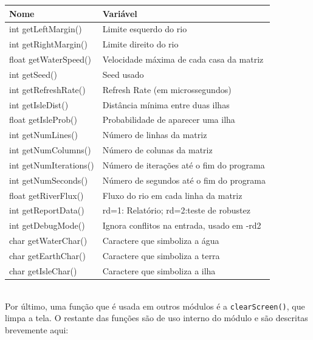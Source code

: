 \documentclass[11pt,a4paper]{article}
\begin{document}
\begin{tabular}{|l|l|}
\hline 
\textbf{Nome} & \textbf{Variável} \\ 
\hline 
int getLeftMargin() & Limite esquerdo do rio \\ 
\hline 
int getRightMargin() & Limite direito do rio \\ 
\hline 
float getWaterSpeed() & Velocidade máxima de cada casa da matriz \\ 
\hline 
int getSeed() & Seed usado \\ 
\hline 
int getRefreshRate() & Refresh Rate (em microssegundos) \\ 
\hline 
int getIsleDist() & Distância mínima entre duas ilhas \\ 
\hline 
float getIsleProb() & Probabilidade de aparecer uma ilha \\ 
\hline 
int getNumLines() & Número de linhas da matriz \\ 
\hline 
int getNumColumns() & Número de colunas da matriz \\ 
\hline 
int getNumIterations() & Número de iterações até o fim do programa \\ 
\hline 
int getNumSeconds() & Número de segundos até o fim do programa \\ 
\hline 
float getRiverFlux() & Fluxo do rio em cada linha da matriz \\ 
\hline 
int getReportData() & rd=1: Relatório; rd=2:teste de robustez \\ 
\hline 
int getDebugMode() & Ignora conflitos na entrada, usado em -rd2 \\ 
\hline 
char getWaterChar() & Caractere que simboliza a água \\ 
\hline 
char getEarthChar() & Caractere que simboliza a terra \\ 
\hline 
char getIsleChar() & Caractere que simboliza a ilha \\ 
\hline 
\end{tabular} 
\vspace{1cm}\\
Por último, uma função que é usada em outros módulos é a \verb|clearScreen()|, que limpa a tela. O restante das funções são de uso interno do módulo e são descritas brevemente aqui:
\end{document}
